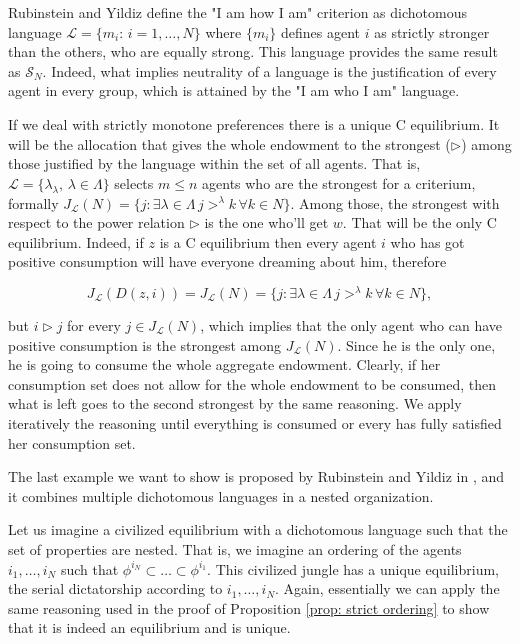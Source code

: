 Rubinstein and Yildiz define the "I am how I am" criterion as dichotomous language $\mathcal{L}=\{m_i:\,i=1,\dots,N\}$ where $\{m_i\}$ defines agent $i$ as strictly stronger than the others, who are equally strong. This language provides the same result as $\mathcal{S}_N$. Indeed, what implies neutrality of a language is the justification of every agent in every group, which is attained by the "I am who I am" language.

\begin{example}
    If we deal with strictly monotone preferences there is a unique C equilibrium. It will be the allocation that gives the whole endowment to the strongest ($\triangleright$) among those justified by the language within the set of all agents. That is, $\mathcal{L}=\{\lambda_{\lambda},\,\lambda\in\Lambda\}$ selects $m\leq n$ agents who are the strongest for a criterium, formally $J_{\mathcal{L}}(N)=\{j:\exists \lambda\in\Lambda\,j>^{\lambda}k\,\forall k\in N\}$. Among those, the strongest with respect to the power relation $\triangleright$ is the one who'll get $w$. That will be the only C equilibrium. Indeed, if $z$ is a C equilibrium then every agent $i$ who has got positive consumption will have everyone dreaming about him, therefore
    
    \[J_{\mathcal{L}}(D(z,i))=J_{\mathcal{L}}(N)=\{j:\exists \lambda\in\Lambda\,j>^{\lambda}k\,\forall k\in N\},\]

    but $i\triangleright j$ for every $j\in J_{\mathcal{L}}(N)$, which implies that the only agent who can have positive consumption is the strongest among $J_{\mathcal{L}}(N)$. Since he is the only one, he is going to consume the whole aggregate endowment. Clearly, if her consumption set does not allow for the whole endowment to be consumed, then what is left goes to the second strongest by the same reasoning. We apply iteratively the reasoning until everything is consumed or every has fully satisfied her consumption set.    
\end{example}

The last example we want to show is proposed by Rubinstein and Yildiz in \cite[RY]{RY}, and it combines multiple dichotomous languages in a nested organization.

\begin{example}
    Let us imagine a civilized equilibrium with a dichotomous language such that the set of properties are nested. That is, we imagine an ordering of the agents $i_1,\dots,i_N$ such that $\phi^{i_N}\subset\dots\subset\phi^{i_1}$. This civilized jungle has a unique equilibrium, the serial dictatorship according to $i_1,\dots,i_N$. Again, essentially we can apply the same reasoning used in the proof of Proposition \ref{prop: strict ordering} to show that it is indeed an equilibrium and is unique. 
\end{example}

